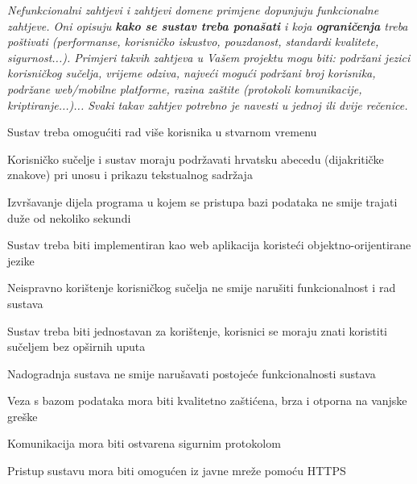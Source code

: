 			 \textit{Nefunkcionalni zahtjevi i zahtjevi domene primjene dopunjuju funkcionalne zahtjeve. Oni opisuju \textbf{kako se sustav treba ponašati} i koja \textbf{ograničenja} treba poštivati (performanse, korisničko iskustvo, pouzdanost, standardi kvalitete, sigurnost...). Primjeri takvih zahtjeva u Vašem projektu mogu biti: podržani jezici korisničkog sučelja, vrijeme odziva, najveći mogući podržani broj korisnika, podržane web/mobilne platforme, razina zaštite (protokoli komunikacije, kriptiranje...)... Svaki takav zahtjev potrebno je navesti u jednoj ili dvije rečenice.}
			 \begin{packed_item}
			 	\item Sustav treba omogućiti rad više korisnika u stvarnom vremenu
			 	\item Korisničko sučelje i sustav moraju podržavati hrvatsku abecedu (dijakritičke znakove) pri unosu i prikazu tekstualnog sadržaja
			 	\item Izvršavanje dijela programa u kojem se pristupa bazi podataka ne smije trajati duže od nekoliko sekundi
			 	\item Sustav treba biti implementiran kao web aplikacija koristeći objektno-orijentirane jezike
			 	\item Neispravno korištenje korisničkog sučelja ne smije narušiti funkcionalnost i rad sustava
			 	\item Sustav treba biti jednostavan za korištenje, korisnici se moraju znati koristiti sučeljem bez opširnih uputa 
			 	\item Nadogradnja sustava ne smije narušavati postojeće funkcionalnosti sustava
			 	\item Veza s bazom podataka mora biti kvalitetno zaštićena, brza i otporna na vanjske greške
			 	\item Komunikacija mora biti ostvarena sigurnim protokolom
			 	\item Pristup sustavu mora biti omogućen iz javne mreže pomoću HTTPS
			 \end{packed_item}
			 
			 
			 
	